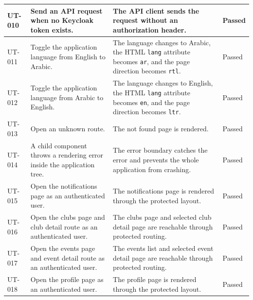 \begin{longtable}{|p{}|p{}|p{}|p{}|}
\hline
UT-010 & Send an API request when no Keycloak token exists. & The API client sends the request without an authorization header. & Passed \\
\hline
UT-011 & Toggle the application language from English to Arabic. & The language changes to Arabic, the HTML \texttt{lang} attribute becomes \texttt{ar}, and the page direction becomes \texttt{rtl}. & Passed \\
\hline
UT-012 & Toggle the application language from Arabic to English. & The language changes to English, the HTML \texttt{lang} attribute becomes \texttt{en}, and the page direction becomes \texttt{ltr}. & Passed \\
\hline
UT-013 & Open an unknown route. & The not found page is rendered. & Passed \\
\hline
UT-014 & A child component throws a rendering error inside the application tree. & The error boundary catches the error and prevents the whole application from crashing. & Passed \\
\hline
UT-015 & Open the notifications page as an authenticated user. & The notifications page is rendered through the protected layout. & Passed \\
\hline
UT-016 & Open the clubs page and club detail route as an authenticated user. & The clubs page and selected club detail page are reachable through protected routing. & Passed \\
\hline
UT-017 & Open the events page and event detail route as an authenticated user. & The events list and selected event detail page are reachable through protected routing. & Passed \\
\hline
UT-018 & Open the profile page as an authenticated user. & The profile page is rendered through the protected layout. & Passed \\
\hline

\end{longtable}
